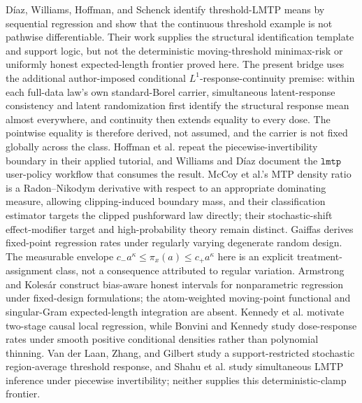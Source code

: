 Díaz, Williams, Hoffman, and Schenck identify threshold-LMTP means by sequential regression and show that the continuous threshold example is not pathwise differentiable. Their work supplies the structural identification template and support logic, but not the deterministic moving-threshold minimax-risk or uniformly honest expected-length frontier proved here. The present bridge uses the additional author-imposed conditional \(L^1\)-response-continuity premise: within each full-data law's own standard-Borel carrier, simultaneous latent-response consistency and latent randomization first identify the structural response mean almost everywhere, and continuity then extends equality to every dose. The pointwise equality is therefore derived, not assumed, and the carrier is not fixed globally across the class. Hoffman et al. repeat the piecewise-invertibility boundary in their applied tutorial, and Williams and Díaz document the \(\texttt{lmtp}\) user-policy workflow that consumes the result. McCoy et al.'s MTP density ratio is a Radon--Nikodym derivative with respect to an appropriate dominating measure, allowing clipping-induced boundary mass, and their classification estimator targets the clipped pushforward law directly; their stochastic-shift effect-modifier target and high-probability theory remain distinct. Gaiffas derives fixed-point regression rates under regularly varying degenerate random design. The measurable envelope \(c_-a^\kappa\leq\pi_x(a)\leq c_+a^\kappa\) here is an explicit treatment-assignment class, not a consequence attributed to regular variation. Armstrong and Kolesár construct bias-aware honest intervals for nonparametric regression under fixed-design formulations; the atom-weighted moving-point functional and singular-Gram expected-length integration are absent. Kennedy et al. motivate two-stage causal local regression, while Bonvini and Kennedy study dose-response rates under smooth positive conditional densities rather than polynomial thinning. Van der Laan, Zhang, and Gilbert study a support-restricted stochastic region-average threshold response, and Shahu et al. study simultaneous LMTP inference under piecewise invertibility; neither supplies this deterministic-clamp frontier.